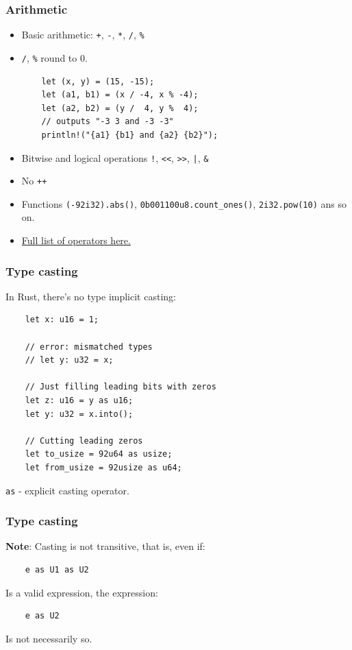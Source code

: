 \documentclass[aspectratio=1610,t]{beamer}
\begin{document}

\begin{frame}[fragile]
\frametitle{Arithmetic}
\begin{itemize}
    \item Basic arithmetic: \texttt{+}, \texttt{-}, \texttt{*}, \texttt{/}, \texttt{\%}
    \item \texttt{/}, \texttt{\%} round to 0.
\begin{verbatim}
    let (x, y) = (15, -15);
    let (a1, b1) = (x / -4, x % -4);
    let (a2, b2) = (y /  4, y %  4);
    // outputs "-3 3 and -3 -3"
    println!("{a1} {b1} and {a2} {b2}");
\end{verbatim}
    \item Bitwise and logical operations \texttt{!}, \texttt{<<}, \texttt{>>}, \texttt{|}, \texttt{\&}
    \item No \texttt{++}
    \item Functions \texttt{(-92i32).abs()}, \texttt{0b001100u8.count\_ones()}, \texttt{2i32.pow(10)} ans so on.
    \item \href{https://doc.rust-lang.org/book/appendix-02-operators.html}{Full list of operators here.}
\end{itemize}
\end{frame}


\begin{frame}[fragile]
\frametitle{Type casting}
In Rust, there's no type implicit casting:

\begin{verbatim}
    let x: u16 = 1;

    // error: mismatched types
    // let y: u32 = x;

    // Just filling leading bits with zeros
    let z: u16 = y as u16;
    let y: u32 = x.into();

    // Cutting leading zeros
    let to_usize = 92u64 as usize;
    let from_usize = 92usize as u64;
\end{verbatim}

\texttt{as} - explicit casting operator.
\end{frame}


\begin{frame}[fragile]
\frametitle{Type casting}
\textbf{Note}: Casting is not transitive, that is, even if:

\begin{verbatim}
    e as U1 as U2
\end{verbatim}

Is a valid expression, the expression:

\begin{verbatim}
    e as U2
\end{verbatim}

Is not necessarily so.
\end{frame}
\end{document}
